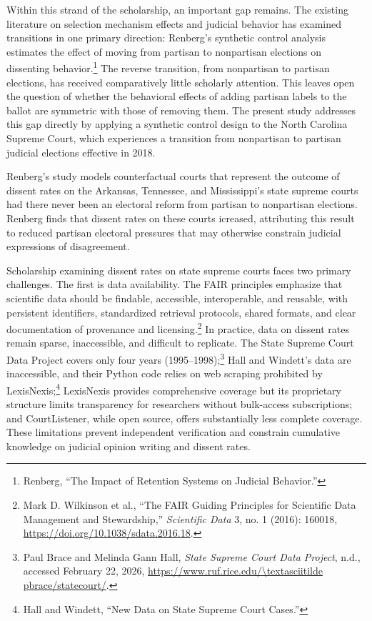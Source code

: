 Within this strand of the scholarship, an important gap remains. The
existing literature on selection mechanism effects and judicial behavior
has examined transitions in one primary direction: Renberg's synthetic
control analysis estimates the effect of moving from partisan to
nonpartisan elections on dissenting behavior.\footnote{Renberg, {``The
  {Impact} of {Retention Systems} on {Judicial Behavior}.''}} The
reverse transition, from nonpartisan to partisan elections, has received
comparatively little scholarly attention. This leaves open the question
of whether the behavioral effects of adding partisan labels to the
ballot are symmetric with those of removing them. The present study
addresses this gap directly by applying a synthetic control design to
the North Carolina Supreme Court, which experiences a transition from
nonpartisan to partisan judicial elections effective in 2018.

Renberg's study models counterfactual courts that represent the outcome
of dissent rates on the Arkansas, Tennessee, and Mississippi's state
supreme courts had there never been an electoral reform from partisan to
nonpartisan elections. Renberg finds that dissent rates on these courts
icreased, attributing this result to reduced partisan electoral
pressures that may otherwise constrain judicial expressions of
disagreement.

Scholarship examining dissent rates on state supreme courts faces two
primary challenges. The first is data availability. The FAIR principles
emphasize that scientific data should be findable, accessible,
interoperable, and reusable, with persistent identifiers, standardized
retrieval protocols, shared formats, and clear documentation of
provenance and licensing.\footnote{{Mark D. Wilkinson et al.}, {``The
  {FAIR Guiding Principles} for Scientific Data Management and
  Stewardship,''} \emph{Scientific Data} 3, no. 1 (2016): 160018,
  \url{https://doi.org/10.1038/sdata.2016.18}.} In practice, data on
dissent rates remain sparse, inaccessible, and difficult to replicate.
The State Supreme Court Data Project covers only four years
(1995--1998);\footnote{Paul Brace and Melinda Gann Hall, \emph{State
  {Supreme Court Data Project}}, n.d., accessed February 22, 2026,
  \href{https://www.ruf.rice.edu//textasciitilde\%20pbrace/statecourt/}{https://www.ruf.rice.edu/\textbackslash textasciitilde
  pbrace/statecourt/}.} Hall and Windett's data are inaccessible, and
their Python code relies on web scraping prohibited by
LexisNexis;\footnote{Hall and Windett, {``New {Data} on {State Supreme
  Court Cases}.''}} LexisNexis provides comprehensive coverage but its
proprietary structure limits transparency for researchers without
bulk-access subscriptions; and CourtListener, while open source, offers
substantially less complete coverage. These limitations prevent
independent verification and constrain cumulative knowledge on judicial
opinion writing and dissent rates.

